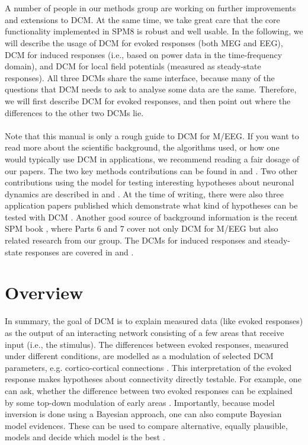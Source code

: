\\
\\
A number of people in our methods group are working on further
improvements and extensions to DCM. At the same time, we take great
care that the core functionality implemented in SPM8 is robust and
well usable. In the following, we will describe the usage of DCM for evoked
responses (both MEG and EEG), DCM for induced responses (i.e., based
on power data in the time-frequency domain), and DCM for local field
potentials (measured as steady-state responses). All three DCMs share the
same interface, because many of the questions that DCM needs to
ask to analyse some data are the same. Therefore, we will first
describe DCM for evoked responses, and then point out where the
differences to the other two DCMs lie.
\\
\\
Note that this manual is only a rough guide to DCM for
M/EEG. If you want to read more about the scientific background, the
algorithms used, or how one would typically use DCM in applications,
we recommend reading a fair dosage of our papers. The two key methods
contributions can be found in \cite{od_dcm_erp} and
\cite{sjk_dcm_erp}. Two other contributions using the model for
testing interesting hypotheses about neuronal dynamics are described 
in \cite{sjk_dcm_intrinsic} and \cite{matthias_dcm_constraints}. At
the time of writing, there were also three application papers published which demonstrate
what kind of hypotheses can be tested with DCM
\cite{mg_dcm_repro,mg_feedback,marta_mmndcm}. Another good source of
background information is the recent SPM book
\cite{spm_book}, where Parts 6 and 7 cover not only DCM for M/EEG but
also related research from our group. The DCMs for induced responses
and steady-state responses are covered in \cite{cc_induced} and
\cite{rm_spectralnmm,rm_massmodelspectral}.

\section{Overview}
In summary, the goal of DCM is to explain measured data (like evoked
responses) as the output of an interacting network consisting of a few
areas that receive input (i.e., the stimulus). The differences between
evoked responses, measured under different conditions, are modelled as
a modulation of selected DCM parameters, e.g. cortico-cortical
connections \cite{od_dcm_erp}. This interpretation of the evoked
response makes hypotheses about connectivity directly testable. For 
example, one can ask, whether the difference between two
evoked responses can be explained by some top-down modulation of early areas
\cite{mg_dcm_repro}. Importantly, because model inversion is done
using a Bayesian approach, one can also compute Bayesian model evidences. These
can be used to compare alternative, equally plausible, models and
decide which model is the best \cite{stefan_neurodynamics}. 

